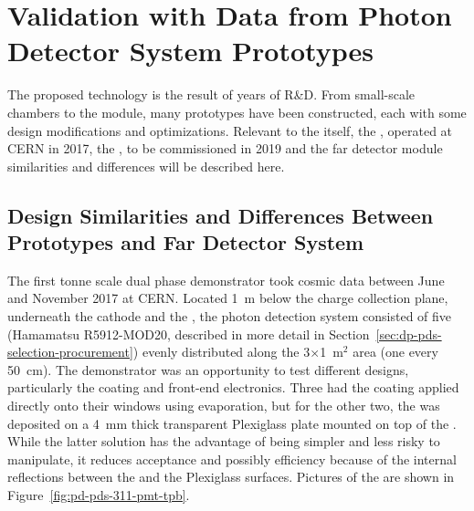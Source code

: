 \section{Validation with Data from Photon Detector System Prototypes}
\label{sec:dp-pds-prototypes}

The    proposed technology is the result of years of R\&D. From small-scale chambers to the  module, many prototypes have been constructed, each with some design modifications and optimizations. 
Relevant to the  itself, the , operated at CERN in 2017, the , to be commissioned in 2019 and the  far detector module similarities and differences will be described here.

\subsection{Design Similarities and Differences Between Prototypes and Far Detector System}

The first tonne scale dual phase   demonstrator took cosmic data between June and November \num{2017} at CERN. 
Located \SI{1}{m} below the charge collection plane, underneath the cathode and the , the photon detection system consisted of five  (Hamamatsu R5912-MOD20, described in more detail in Section~\ref{sec:dp-pds-selection-procurement}) evenly distributed along the 3$\times$1~m$^2$ area (one  every \SI{50}{cm}). The demonstrator was an opportunity to test different  designs, particularly the  coating and front-end electronics. Three  had the  coating applied directly onto their windows using evaporation, but for the other two, the  was deposited on a \SI{4}{\mm} thick transparent Plexiglass plate mounted on top of the . 
While the latter solution has the advantage of being simpler and less risky to manipulate, it reduces acceptance and possibly efficiency because of the internal reflections between the  and the Plexiglass surfaces. 
Pictures of the   are shown in Figure~\ref{fig:pd-pds-311-pmt-tpb}.

